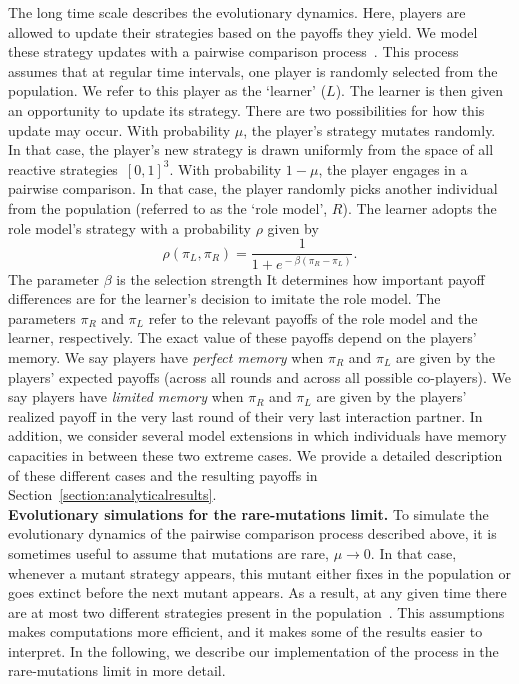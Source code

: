 \documentclass[11pt]{article}
\theoremstyle{plainCl1}
\theoremstyle{plainCl2}
\begin{document}
The long time scale describes the evolutionary dynamics. 
Here, players are allowed to update their strategies based on the payoffs they yield. 
We model these strategy updates with a pairwise comparison process~\citep{traulsen2007pairwise}.
This process assumes that at regular time intervals, one player is randomly selected from the population.
We refer to this player as the `learner' ($L$). 
The learner is then given an opportunity to update its strategy. 
There are two possibilities for how this update may occur. 
With probability $\mu$, the player's strategy mutates randomly. 
In that case, the player's new strategy is drawn uniformly from the space of all reactive strategies~$[0,1]^3$.  
With probability $1\!-\!\mu$, the player engages in a pairwise comparison. 
In that case, the player randomly picks another individual from the population (referred to as the `role model', $R$). 
The learner adopts the role model's strategy with a probability \(\rho\) given by
\begin{equation} \label{Eq:rho}
    \rho(\pi_{L}, \pi_{R}) = \frac{1}{1\!+\! e^{\!-\!\beta (\pi_{R} - \pi_{L})}}.
\end{equation}
The parameter \(\beta\) is the selection strength
It determines how important payoff differences are for the learner's decision to imitate the role model. 
The parameters $\pi_R$ and $\pi_L$ refer to the relevant payoffs of the role model and the learner, respectively. 
The exact value of these payoffs depend on the players' memory. 
We say players have {\it perfect memory} when $\pi_R$ and $\pi_L$ are given by the players' expected payoffs (across all rounds and across all possible co-players). 
We say players have {\it limited memory} when $\pi_R$ and $\pi_L$ are given by the players' realized payoff in the very last round of their very last interaction partner. 
In addition, we consider several model extensions in which individuals have memory capacities in between these two extreme cases. 
We provide a detailed description of these different cases and the resulting payoffs in Section~\ref{section:analyticalresults}.\\


\noindent
{\bf Evolutionary simulations for the rare-mutations limit.} 
To simulate the evolutionary dynamics of the pairwise comparison process described above, it is sometimes useful to assume that mutations are rare, $\mu\!\rightarrow\!0$. 
In that case, whenever a mutant strategy appears, this mutant either fixes in the population or goes extinct before the next mutant appears. 
As a result, at any given time there are at most two different strategies present in the population~\citep{fudenberg:JET:2006,wu:JMB:2012,mcavoy:jet:2015}. 
This assumptions makes computations more efficient, and it makes some of the results easier to interpret.
In the following, we describe our implementation of the process in the rare-mutations limit in more detail. 
\end{document}

